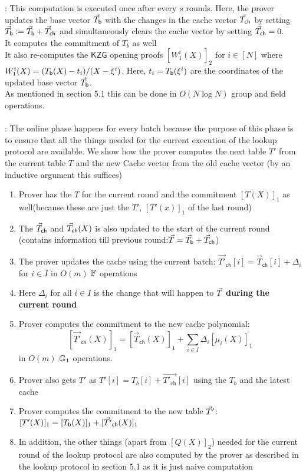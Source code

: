 : This computation is executed once after every $s$ rounds. Here, the prover updates the base vector $\vec{T}_{\mathsf{b}}$ with the changes in the cache vector
$\vec{T}_{\mathsf{ch}}$ by setting $\vec{T}_{\mathsf{b}} := \vec{T}_{\mathsf{b}} + \vec{T}_{\mathsf{ch}}$ and simultaneously clears the cache vector by setting
$\vec{T}_{\mathsf{ch}} = 0$.\\
It computes the commitment of $T_b$ as well\\
It also re-computes the $\mathsf{KZG}$ opening proofs $[W_1^i(X)]_2$ for $i\in [N]$ where
$W_1^i(X) = (T_{\mathsf{b}}({X}) - t_i)/(X-\xi^i)$. Here, $t_i=T_{\mathsf{b}}({\xi^i})$ are the coordinates
of the updated base vector $\vec{T}_{\mathsf{b}}$.\\
As mentioned in section 5.1 this can be done in $O(N\log N)$ group and field operations.\\\\
:
The online phase happens for every batch because the purpose of this phase is to ensure that all the things needed for the current execution of the lookup protocol are available. We show how the prover computes the next table $T'$ from the current table $T$ and the new Cache vector from the old cache vector (by an inductive argument this suffices)
\begin{enumerate}[leftmargin=1em]
    \item Prover has the $T$ for the current round and the commitment $[T(X)]_1$ as well(because these are just the $T'$, $[T'(x)]_1$ of the last round)
    \item The $\vec{T}_{\mathsf{ch}}$ and $\vec{T}_{\mathsf{ch}}(X)$ is also updated to the start of the current round (contains information till previous round:$\vec{T}=\vec{T}_{\mathsf{b}}+\vec{T}_{\mathsf{ch}}$)
    \item The prover updates the cache using the current batch: $\vec{T'}_{\mathsf{ch}}[i] = \vec{T}_{\mathsf{ch}}[i] + \Delta_i$ for $i\in I$ in $O(m)$ $\mathbb{F}$ operations
    \item Here $\Delta_i$ for all $i \in I$ is the change that will happen to $\vec{T}$ \textbf{during the current round}
    \item Prover computes the commitment to the new cache polynomial:
    $$[\vec{T'}_{\mathsf{ch}}(X)]_1=[\vec{T}_{\mathsf{ch}}(X)]_1+\sum_{i\in I}\Delta_i[\mu_i(X)]_1$$ in
    $O(m)$ $\mathbb{G}_1$ operations.
    \item Prover also gets ${T}'$ as ${T'}[i]=T_b[i]+ \vec{T'_{\text{ch}}}[i]$ using the $T_b$ and the latest cache
    \item Prover computes the commitment to the new table $\vec{T}'$: $[T'(X)]_1=[T_{\mathsf{b}}({X})]_1+[\vec{T'}_{\mathsf{ch}}(X)]_1$

    \item In addition, the other things (apart from $[Q(X)]_2$) needed for the current round of the lookup protocol are also computed by the prover as described in the lookup protocol in section 5.1 as it is just naive computation



\end{enumerate}

